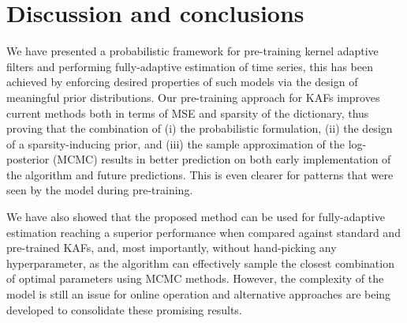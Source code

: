 \section{Discussion and conclusions}
We have presented a probabilistic framework for pre-training kernel adaptive filters and performing fully-adaptive estimation of time series, this has been achieved by enforcing desired properties of such models via the design of meaningful prior distributions. Our pre-training approach for KAFs improves current methods both in terms of MSE and sparsity of the dictionary, thus proving that the combination of (i) the probabilistic formulation, (ii) the design of a sparsity-inducing prior, and (iii) the sample approximation of the log-posterior (MCMC) results in better prediction on both early implementation of the algorithm and future predictions. This is even clearer for patterns that were seen by the model during pre-training.

We have also showed that the proposed method can be used for fully-adaptive estimation reaching a superior
performance when compared against standard and pre-trained KAFs, and, most importantly, without hand-picking any hyperparameter, as the algorithm can effectively sample the closest combination of optimal parameters using MCMC methods. However, the complexity of the model is still an issue for online operation and alternative approaches are being developed to consolidate these promising results.  